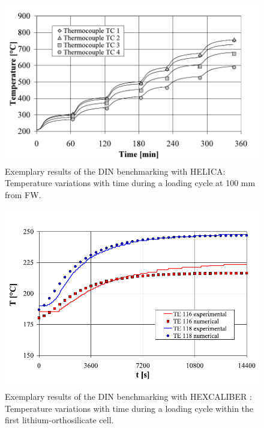 \begin{figure}[t!]
    \centering
    \includegraphics[width=\singleimagewidth]{figures/Fig-8}
    \caption{Exemplary results of the DIN benchmarking with HELICA: Temperature variations with time during a loading cycle at 100 mm from FW\cite{DellOrco:2007hc}.}
    \label{fig:DIN_HELICA}
\end{figure}


\begin{figure}[t!]
    \centering
    \includegraphics[width=\singleimagewidth]{figures/Fig-9}
    \caption{Exemplary results of the DIN benchmarking with HEXCALIBER : Temperature variations with time during a loading cycle within the first lithium-orthosilicate cell\cite{DellOrco:2010zr}.}
    \label{fig:DIN_HEX}
\end{figure}




\FloatBarrier
